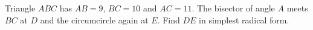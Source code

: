 Triangle $ABC$ has $AB=9$, $BC=10$ and $AC=11$. The bisector of angle $A$ meets $BC$ at $D$ and the circumcircle again at $E$. Find $DE$ in simplest radical form.
